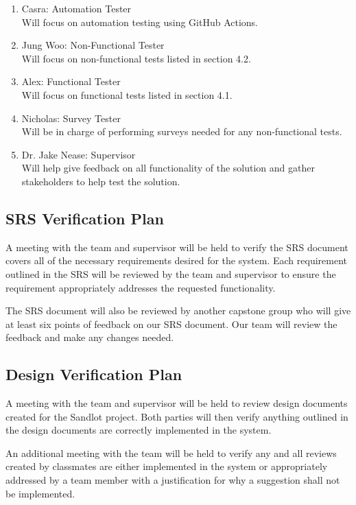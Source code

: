 \documentclass[12pt, titlepage]{article}
\begin{document}
\begin{enumerate}
  \item Casra: Automation Tester\\
  Will focus on automation testing using GitHub Actions.
  \item Jung Woo: Non-Functional Tester\\
  Will focus on non-functional tests listed in section 4.2.
  \item Alex: Functional Tester\\
  Will focus on functional tests listed in section 4.1.
  \item Nicholas: Survey Tester\\
  Will be in charge of performing surveys needed for any non-functional tests.
  \item Dr. Jake Nease: Supervisor\\
  Will help give feedback on all functionality of the solution and gather
  stakeholders to help test the solution.
\end{enumerate}

\subsection{SRS Verification Plan}

A meeting with the team and supervisor will be held to verify the SRS document covers all of
the necessary requirements desired for the system. Each requirement outlined in the SRS will
be reviewed by the team and supervisor to ensure the requirement appropriately addresses the
requested functionality.

The SRS document will also be reviewed by another capstone group who will give
at least six points of feedback on our SRS document. Our team will review the
feedback and make any changes needed.

\subsection{Design Verification Plan}

A meeting with the team and supervisor will be held to review design documents created
for the Sandlot project. Both parties will then verify anything outlined in the design
documents are correctly implemented in the system.

An additional meeting with the team will be held to verify any and all reviews created by
classmates are either implemented in the system or appropriately addressed by a team member
with a justification for why a suggestion shall not be implemented.
\end{document}
